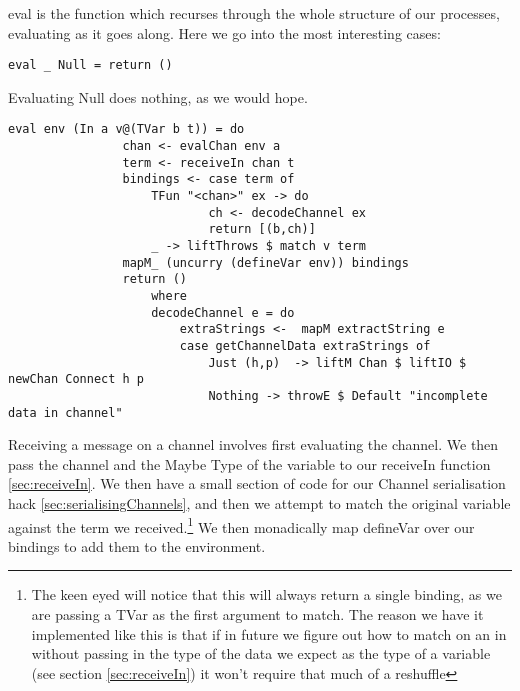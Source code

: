 eval is the function which recurses through the whole structure of our processes, evaluating as it goes along. Here we go into the most interesting cases:


\begin{verbatim}
eval _ Null = return ()
\end{verbatim}
Evaluating Null does nothing, as we would hope.

\begin{verbatim}
eval env (In a v@(TVar b t)) = do
                chan <- evalChan env a
                term <- receiveIn chan t
                bindings <- case term of
                    TFun "<chan>" ex -> do
                            ch <- decodeChannel ex
                            return [(b,ch)]
                    _ -> liftThrows $ match v term
                mapM_ (uncurry (defineVar env)) bindings
                return ()
                    where
                    decodeChannel e = do
                        extraStrings <-  mapM extractString e
                        case getChannelData extraStrings of
                            Just (h,p)  -> liftM Chan $ liftIO $ newChan Connect h p
                            Nothing -> throwE $ Default "incomplete data in channel"
\end{verbatim}

Receiving a message on a channel involves first evaluating the channel. We then pass the channel and the Maybe Type of the variable to our receiveIn function \ref{sec:receiveIn}. We then have a small section of code for our Channel serialisation hack \ref{sec:serialisingChannels}, and then we attempt to match the original variable against the term we received.\footnote{The keen eyed will notice that this will always return a single binding, as we are passing a TVar as the first
    argument to match. The reason we have it implemented like this is that if in future we figure out how to match on an in without passing in the type of the data we expect as the type of a variable (see section \ref{sec:receiveIn}) it won't require that much of a reshuffle}
We then monadically map defineVar over our bindings to add them to the environment.

